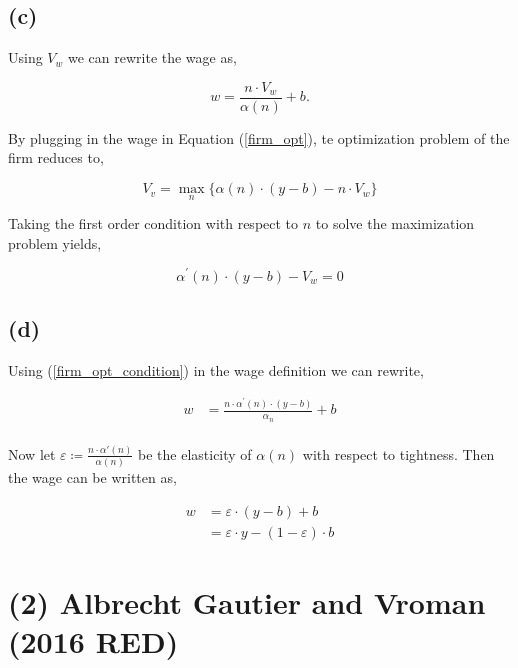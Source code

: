\documentclass[american]{scrartcl}
\begin{document}
\subsection*{(c)}

Using $V_w$ we can rewrite the wage as,

\begin{equation}
    w = \frac{n \cdot V_w}{\alpha(n)} + b.
\end{equation}

By plugging in the wage in Equation (\ref{firm_opt}), te optimization problem of the firm reduces to,

\begin{equation}
    V_v = \max_{n} \{ \alpha(n) \cdot (y - b) - n \cdot V_w \}
\end{equation}

Taking the first order condition with respect to $n$ to solve the maximization problem yields,

\begin{equation} \label{firm_opt_condition}
    \alpha^\prime(n) \cdot(y-b) - V_w = 0
\end{equation}

\subsection*{(d)}

Using (\ref{firm_opt_condition}) in the wage definition we can rewrite,

\begin{equation}
    \begin{split}
        w &= \frac{n \cdot \alpha^\prime(n) \cdot(y-b)}{\alpha_n} + b \\
    \end{split}
\end{equation}

Now let $\varepsilon \coloneqq \frac{n \cdot \alpha\prime(n)}{\alpha(n)}$ be the elasticity of $\alpha(n)$ with respect to tightness. Then the wage can be written as,

\begin{equation}
    \begin{split}
        w &= \varepsilon \cdot (y - b) + b \\
        &= \varepsilon \cdot y - (1 - \varepsilon) \cdot b
    \end{split}
\end{equation}

\section*{(2) Albrecht Gautier and Vroman (2016 RED)}
\end{document}
